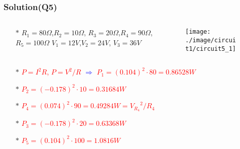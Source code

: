 \documentclass{beamer}
\newcommand{\blue}[1]{\textcolor{blue}{#1}}
\newcommand{\red}[1]{\textcolor{red}{#1}}
\begin{document}
\begin{frame}
\frametitle{Solution(Q5)}
\begin{columns}
\begin{column}{5cm}
\begin{itemize} \itemsep1pt \parskip0pt 
  \item[$\ast$]  $R_1 = 80\Omega$,$R_2 = 10\Omega$,\newline
  $R_3 = 20\Omega$,$R_4 = 90\Omega$,\newline
  $R_5 = 100\Omega$ \newline
  $V_1 = 12V$,$V_2 = 24V$,\newline
  $V_3 = 36V$
\end{itemize}
\end{column}



\begin{column}{8cm}
\begin{figure}[H]
  \centering
  \texttt{[image: ./image/circuit1/circuit5\_1]}
\end{figure}
\end{column}
\end{columns}

\begin{itemize} \itemsep1pt \parskip0pt 
  \item[$\ast$] \red{$P = I^2R$, $P = V^2/R$} \blue{$\Rightarrow$} \red{$P_1 = (0.104)^2 \cdot 80 = 0.86528W$}
  \item[$\ast$] \red{$P_2 = (-0.178)^2 \cdot 10 = 0.31684W$}
  \item[$\ast$] \red{$P_4 = (0.074)^2 \cdot 90 = 0.49284W = {V_{R_4}}^2/R_4$}
  \item[$\ast$] \red{$P_3 = (-0.178)^2 \cdot 20 = 0.63368W$}
  \item[$\ast$] \red{$P_5 = (0.104)^2 \cdot 100 = 1.0816W$}
\end{itemize}

\end{frame}

\end{document}
